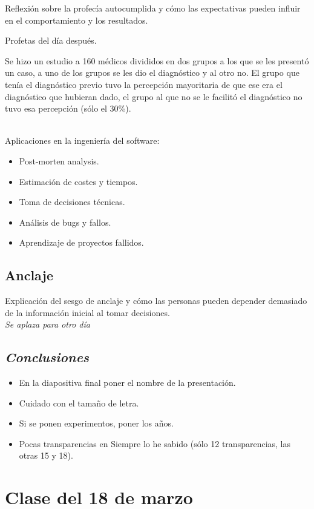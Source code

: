 \documentclass[12pt, a4paper, twoside]{article}
\begin{document}
Reflexión sobre la profecía autocumplida y cómo las expectativas pueden influir en el comportamiento y los resultados.


Profetas del día después.

Se hizo un estudio a 160 médicos divididos en dos grupos a los que se les presentó un caso, a uno de los grupos se les dio el diagnóstico
y al otro no. El grupo que tenía el diagnóstico previo tuvo la percepción mayoritaria de que ese era el diagnóstico que hubieran dado, el grupo 
al que no se le facilitó el diagnóstico no tuvo esa percepción (sólo el 30\%).
\\\

Aplicaciones en la ingeniería del software:
\begin{itemize}
    \item Post-morten analysis.
    \item Estimación de costes y tiempos.
    \item Toma de decisiones técnicas.
    \item Análisis de bugs y fallos.
    \item Aprendizaje de proyectos fallidos.
\end{itemize}


\subsection{Anclaje}
Explicación del sesgo de anclaje y cómo las personas pueden depender demasiado de la información inicial al tomar decisiones.\\
\textit{Se aplaza para otro día}


\subsection{\textit{Conclusiones}}
\begin{itemize}
    \item En la diapositiva final poner el nombre de la presentación.
    \item Cuidado con el tamaño de letra.
    \item Si se ponen experimentos, poner los años.
    \item Pocas transparencias en Siempre lo he sabido (sólo 12 transparencias, las otras 15 y 18).

\end{itemize}

\section{Clase del 18 de marzo}
\end{document}
